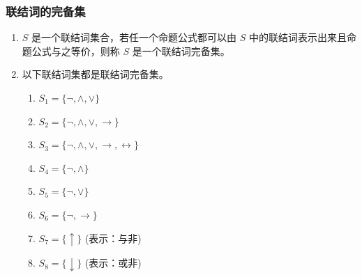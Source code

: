 \subsubsection{联结词的完备集}
\begin{enumerate}
	
	\item[\textbf{def：}] \(S\) 是一个联结词集合，若任一个命题公式都可以由 \(S\) 中的联结词表示出来且命题公式与之等价，则称 \(S\) 是一个联结词完备集。
	
	\item[\textbf{Th：}] 以下联结词集都是联结词完备集。
	
	\begin{enumerate}
		\item \(S_1=\{\neg,\land,\lor\}\)
		\item \(S_2=\{\neg,\land,\lor,\to\}\)
		\item \(S_3=\{\neg,\land,\lor,\to,\leftrightarrow\}\)
		\item \(S_4=\{\neg,\land\}\)
		\item \(S_5=\{\neg,\lor\}\)
		\item \(S_6=\{\neg,\to\}\)
		\item \(S_7=\{\uparrow\}\) (表示：与非)
		\item \(S_8=\{\downarrow\}\) (表示：或非)
	\end{enumerate}
	
\end{enumerate}

